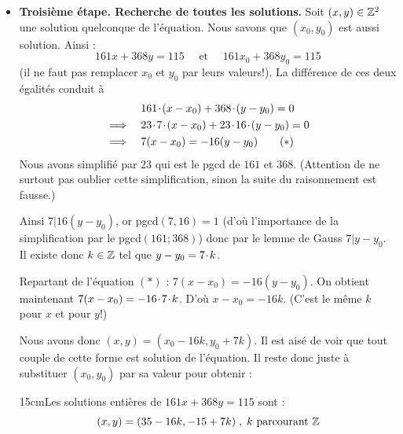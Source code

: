 \begin{itemize}
 \item  \textbf{Troisième étape. Recherche de toutes les solutions.}
Soit $(x,y) \in \mathbb{Z}^2$ une solution quelconque de l'équation.
Nous savons que $(x_0,y_0)$ est aussi solution. Ainsi :
$$161x+368y=115 \quad \text{ et } \quad 161x_0+368y_0=115$$
(il ne faut pas remplacer $x_0$ et $y_0$ par leurs valeurs!).
La différence de ces deux égalités conduit à
\begin{align*}
& 161 \hspace*{-0.5mm}\cdot\hspace*{-0.5mm} (x-x_0) + 368 \hspace*{-0.5mm}\cdot\hspace*{-0.5mm} (y-y_0) = 0 \\
\implies \quad & 23 \hspace*{-0.5mm}\cdot\hspace*{-0.5mm} 7 \hspace*{-0.5mm}\cdot\hspace*{-0.5mm} (x-x_0) + 23 \hspace*{-0.5mm}\cdot\hspace*{-0.5mm} 16 \hspace*{-0.5mm}\cdot\hspace*{-0.5mm}  (y-y_0) = 0 \\
\implies \quad & 7 (x-x_0) = -16 (y-y_0) \qquad  (*)\\
\end{align*}
Nous avons simplifié par $23$ qui est le pgcd de $161$ et $368$.
(Attention de ne surtout pas oublier cette simplification, sinon la suite du raisonnement
est fausse.)

Ainsi $7 | 16(y-y_0)$, or pgcd$(7,16)=1$ (d'où l'importance de la simplification par le pgcd$(161;368)$) donc par le lemme de Gauss $7|y-y_0$.
Il existe donc $k\in \mathbb{Z}$ tel que $y-y_0 = 7 \hspace*{-0.5mm}\cdot\hspace*{-0.5mm} k$.

\smallskip
Repartant de l'équation $(*)$ : $7 (x-x_0) = -16 (y-y_0)$.
On obtient maintenant $7(x-x_0)=-16\hspace*{-0.5mm}\cdot\hspace*{-0.5mm} 7 \hspace*{-0.5mm}\cdot\hspace*{-0.5mm} k$.
D'où $x-x_0 = -16k$. (C'est le même $k$ pour $x$ et pour $y$!)

\smallskip
Nous avons donc $(x,y) = (x_0-16k,y_0+7k)$.
Il est aisé de voir que tout couple de cette forme est solution de l'équation.
Il reste donc juste à substituer $(x_0,y_0)$ par sa valeur pour obtenir :
\begin{encadre}{15cm}{Les solutions entières de $161x+368y=115$
sont : $$(x,y) = (35-16k,-15+7k)\;,\; k \textrm{ parcourant }\mathbb{Z}$$}\end{encadre}
\end{itemize}



